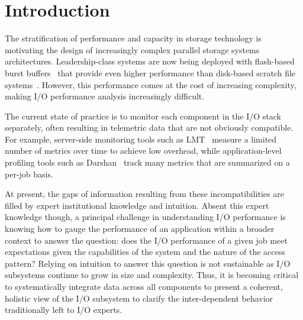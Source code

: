 \section{Introduction} \label{sec:introduction}

The stratification of performance and capacity in storage technology is motivating the design of increasingly complex parallel storage systems architectures.
Leadership-class systems are now being deployed with flash-based burst buffers~\cite{Henseler2016} that provide even higher performance than disk-based scratch file systems~\cite{Bhimji2016}.
However, this performance comes at the cost of increasing complexity, making I/O performance analysis increasingly difficult.

The current state of practice is to monitor each component in the I/O stack separately, often resulting in telemetric data that are not obviously compatible.
For example, server-side monitoring tools such as LMT~\cite{lmt} measure a limited number of metrics over time to achieve low overhead, while application-level profiling tools such as Darshan~\cite{carns200924} track many metrics that are summarized on a per-job basis.

At present, the gaps of information resulting from these incompatibilities are filled by expert institutional knowledge and intuition.
Absent this expert knowledge though, a principal challenge in understanding I/O performance is knowing how to gauge the performance of an application within a broader context to answer the question: 
does the I/O performance of a given job meet expectations given the capabilities of the system and the nature of the access pattern?
Relying on intuition to answer this question is not sustainable as I/O subsystems continue to grow in size and complexity.
Thus, it is becoming critical to systematically integrate data across all components to present a coherent, holistic view of the I/O subsystem to clarify the inter-dependent behavior traditionally left to I/O experts.

